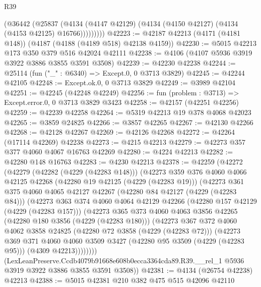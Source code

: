 \begin{lexlean}{R39}
\begin{coremodule}
            (@36442
              (@25837
                (@4134 (@4147 @42129) (@4134 (@4150 @42127) (@4134 (@4153 @42125) @16766)))))))))
@42223 := @42187 @42213 (@4171 (@4181 @148)) (@4187 (@4188 (@4189 @518) @42138 @4159))
@42230 := @5015 @42213 @173 @350 @379 @516 @42024 @42111
@42238 := @4106 (@4107 @5936 @3919 @3922 @3886 @3855 @3591 @3508)
@42239 := @42230 @42238
@42244 := @25114 (fun ("_" : @6340) => Except.{0, 0} @3713 @3829)
@42245 := @42244 @42105
@42248 := Except.ok.{0, 0} @3713 @3829
@42249 := @3989 @42104
@42251 := @42245 (@42248 @42249)
@42256 := fun (problem : @3713) => Except.error.{0, 0} @3713 @3829 @3423
@42258 := @42157 (@42251 @42256)
@42259 := @42239 @42258
@42264 := @5319 @42213 @19 @378 @4068 @42023
@42265 := @3859 @24825
@42266 := @3857 @42265
@42267 := @42130 @42266
@42268 := @42128 @42267
@42269 := @42126 @42268
@42272 := @42264 (@17114 @42269) @42238
@42273 := @4215 @42213
@42279 := @42273 @357 @377 @4060 @4067 @16763 @42269
@42280 := @4224 @42213
@42282 := @42280 @148 @16763
@42283 := @4230 @42213
@42378 := @42259
    (@42272
      (@42279
        (@42282 (@4229 (@42283 @148)))
        (@42273
          @359
          @376
          @4060
          @4066
          @42125
          @42268
          (@42280 @19 @42125 (@4229 (@42283 @19)))
          (@42273
            @361
            @375
            @4060
            @4065
            @42127
            @42267
            (@42280 @84 @42127 (@4229 (@42283 @84)))
            (@42273
              @363
              @374
              @4060
              @4064
              @42129
              @42266
              (@42280 @157 @42129 (@4229 (@42283 @157)))
              (@42273
                @365
                @373
                @4060
                @4063
                @3856
                @42265
                (@42280 @180 @3856 (@4229 (@42283 @180)))
                (@42273
                  @367
                  @372
                  @4060
                  @4062
                  @3858
                  @24825
                  (@42280 @72 @3858 (@4229 (@42283 @72)))
                  (@42273
                    @369
                    @371
                    @4060
                    @4060
                    @3509
                    @3427
                    (@42280 @95 @3509 (@4229 (@42283 @95)))
                    (@4309 @42213))))))))
      (LexLeanPreserve.Ccdb4079b91668e608b0ecca3364cda89.R39.__rel_1
        @5936
        @3919
        @3922
        @3886
        @3855
        @3591
        @3508))
@42381 := @4134 (@26754 @42238) @42213
@42388 := @5015 @42381 @210 @382 @475 @515 @42096 @42110

\end{coremodule}
\end{lexlean}
